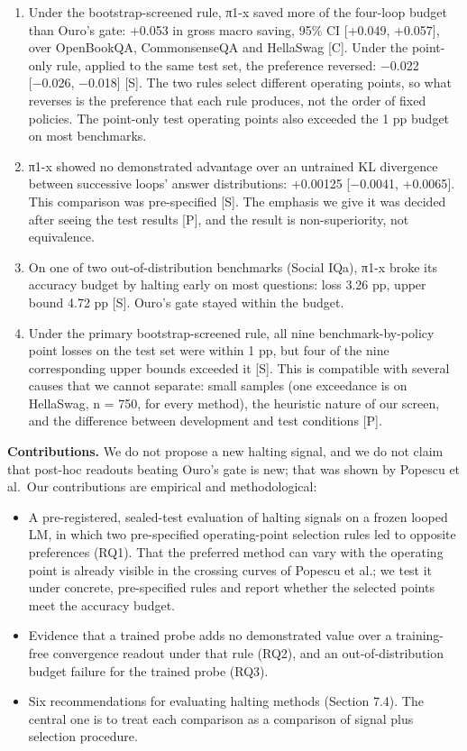 \begin{enumerate}
\def\labelenumi{\arabic{enumi}.}
\tightlist
\item
  Under the bootstrap-screened rule, π1-x saved more of the four-loop budget than Ouro's gate: +0.053 in gross macro saving, 95\% CI
  {[}+0.049, +0.057{]}, over OpenBookQA, CommonsenseQA and HellaSwag {[}C{]}. Under the point-only rule, applied to the same test set, the
  preference reversed: −0.022 {[}−0.026, −0.018{]} {[}S{]}. The two rules select different operating points, so what reverses is the preference that each rule produces, not the
  order of fixed policies. The point-only test operating points also exceeded the 1 pp budget on most benchmarks.
\item
  π1-x showed no demonstrated advantage over an untrained KL divergence between successive loops' answer distributions: +0.00125
  {[}−0.0041, +0.0065{]}. This comparison was pre-specified {[}S{]}. The emphasis we give it was decided after seeing the test results {[}P{]}, and the
  result is non-superiority, not equivalence.
\item
  On one of two out-of-distribution benchmarks (Social IQa), π1-x broke its accuracy budget by halting early on most questions: loss 3.26
  pp, upper bound 4.72 pp {[}S{]}. Ouro's gate stayed within the budget.
\item
  Under the primary bootstrap-screened rule, all nine benchmark-by-policy point losses on the test set were within 1 pp, but four of the
  nine corresponding upper bounds exceeded it {[}S{]}. This is compatible with several causes that we cannot separate: small samples (one
  exceedance is on HellaSwag, n = 750, for every method), the heuristic nature of our screen, and the difference between development and
  test conditions {[}P{]}.
\end{enumerate}

\textbf{Contributions.} We do not propose a new halting signal, and we do not claim that post-hoc readouts beating Ouro's gate is new; that was
shown by Popescu et al.~Our contributions are empirical and methodological:

\begin{itemize}
\tightlist
\item
  A pre-registered, sealed-test evaluation of halting signals on a frozen looped LM, in which two pre-specified operating-point selection rules led to opposite preferences (RQ1). That the preferred method can vary with the
  operating point is already visible in the crossing curves of Popescu et al.; we test it under concrete, pre-specified rules and report whether the selected points meet the accuracy budget.
\item
  Evidence that a trained probe adds no demonstrated value over a training-free convergence readout under that rule (RQ2), and an
  out-of-distribution budget failure for the trained probe (RQ3).
\item
  Six recommendations for evaluating halting methods (Section 7.4). The central one is to treat each comparison as a comparison of signal
  plus selection procedure.
\end{itemize}

